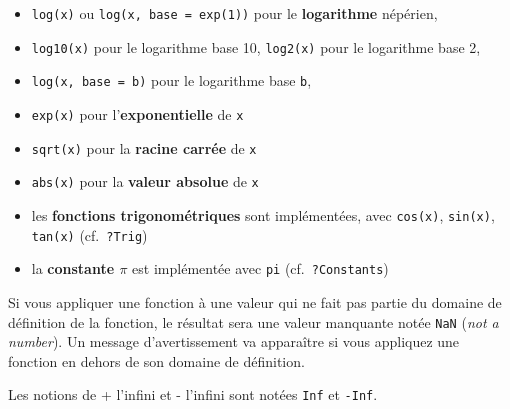 \documentclass[
]{book}
\providecommand{\tightlist}{%
  \setlength{\itemsep}{0pt}\setlength{\parskip}{0pt}}
\begin{document}
\begin{itemize}
\tightlist
\item
  \texttt{log(x)} ou \texttt{log(x,\ base\ =\ exp(1))} pour le \textbf{logarithme} népérien,
\item
  \texttt{log10(x)} pour le logarithme base 10, \texttt{log2(x)} pour le logarithme base 2,
\item
  \texttt{log(x,\ base\ =\ b)} pour le logarithme base \texttt{b},
\item
  \texttt{exp(x)} pour l'\textbf{exponentielle} de \texttt{x}
\item
  \texttt{sqrt(x)} pour la \textbf{racine carrée} de \texttt{x}
\item
  \texttt{abs(x)} pour la \textbf{valeur absolue} de \texttt{x}
\item
  les \textbf{fonctions trigonométriques} sont implémentées, avec \texttt{cos(x)}, \texttt{sin(x)}, \texttt{tan(x)} (cf.~\texttt{?Trig})
\item
  la \textbf{constante \(\pi\)} est implémentée avec \texttt{pi} (cf.~\texttt{?Constants})
\end{itemize}

Si vous appliquer une fonction à une valeur qui ne fait pas partie du domaine de définition de la fonction, le résultat sera une valeur manquante notée \texttt{NaN} (\emph{not a number}). Un message d'avertissement va apparaître si vous appliquez une fonction en dehors de son domaine de définition.

Les notions de + l'infini et - l'infini sont notées \texttt{Inf} et \texttt{-Inf}.
\end{document}
